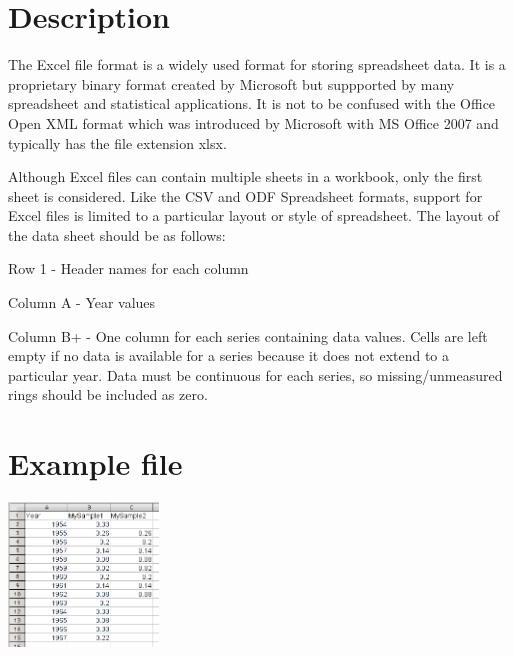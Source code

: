 \section{Description}
The Excel file format is a widely used format for storing spreadsheet data. It is a proprietary binary format created by Microsoft but suppported by many spreadsheet and statistical applications.  It is not to be confused with the Office Open XML format which was introduced by Microsoft with MS Office 2007 and typically has the file extension xlsx.

Although Excel files can contain multiple sheets in a workbook, only the first sheet is considered.  Like the CSV and ODF Spreadsheet formats, support for Excel files is limited to a particular layout or style of spreadsheet. The layout of the data sheet should be as follows:

\begin{itemize*}
 \item Row 1 - Header names for each column
 \item Column A - Year values
 \item Column B+ - One column for each series containing data values. Cells are left empty if no data is available for a series because it does not extend to a particular year. Data must be continuous for each series, so missing/unmeasured rings should be included as zero.
\end{itemize*}

\section{Example file}

\includegraphics[width=4cm]{excel.png}



